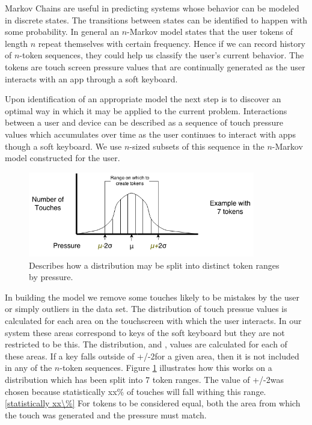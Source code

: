 \documentclass{acm_proc_article-sp}
\begin{document}
Markov Chains are useful in predicting systems whose behavior can be modeled in discrete states. The transitions between states can be identified to happen with some probability.
In general an $n$-Markov model states that the
user tokens of length $n$ repeat themselves with certain frequency. Hence if we can record history
of $n$-token sequences, they could help us classify the user's current behavior. The tokens are
touch screen pressure values that are continually generated as the user interacts with an app
through a soft keyboard.


Upon identification of an appropriate model the next step is to discover an optimal way in which it may be applied to the current problem. Interactions between a user and device can be described as a sequence of touch pressure values which accumulates over time
as the user continues to interact with apps though a soft keyboard.
We use $n$-sized subsets of this sequence in the $n$-Markov model constructed for the user.\cite{marcov_chains_previous_n_values}

\begin{figure}
\centering
\includegraphics[width=3.9in]{token_creation.png}
\caption{Describes how a distribution may be split into distinct token ranges by pressure.}
\label{fig:token_creation}
\end{figure}

In building the model we remove some touches likely to be mistakes by the user or simply outliers in the data set.
The distribution of touch pressue values is calculated for each area on the touchscreen with which the user interacts. In our system these areas correspond to keys of the soft keyboard but they are not restricted to be this.
The distribution, \mu and \sigma, values are calculated for each of these areas.
If a key falls outside of \mu+/-2\sigma for a given area, then it is not included in any of the $n$-token sequences. 
Figure \ref{fig:token_creation} illustrates how this works on a distribution which has been split into 7 token ranges.
The value of \mu+/-2\sigma was chosen because statistically xx\% of touches will fall withing this range. \ref{statistically xx\%}
For tokens to be considered equal, both the area from which the touch was generated and the pressure must match.
\end{document}
